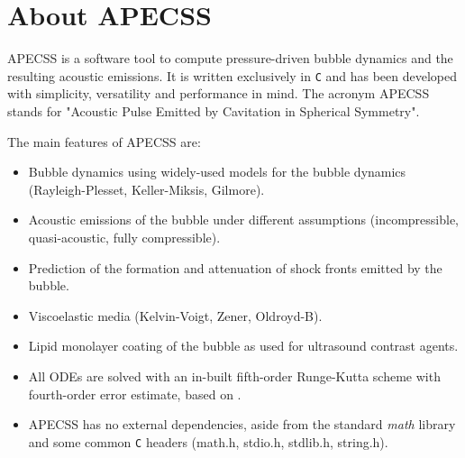 \chapter{About APECSS}

APECSS is a software tool to compute pressure-driven bubble dynamics and the resulting acoustic emissions. It is written exclusively in {\tt C} and has been developed with simplicity, versatility and performance in mind. The acronym APECSS stands for "Acoustic Pulse Emitted by Cavitation in Spherical Symmetry".

The main features of APECSS are:\vspace{-1em}
\begin{itemize}[noitemsep]
\item Bubble dynamics using widely-used models for the bubble dynamics (Rayleigh-Plesset, Keller-Miksis, Gilmore).
\item Acoustic emissions of the bubble under different assumptions (incompressible, quasi-acoustic, fully compressible).
\item Prediction of the formation and attenuation of shock fronts emitted by the bubble.
\item Viscoelastic media (Kelvin-Voigt, Zener, Oldroyd-B).
\item Lipid monolayer coating of the bubble as used for ultrasound contrast agents.
\item All ODEs are solved with an in-built fifth-order Runge-Kutta scheme with fourth-order error estimate, based on \citet{Dormand1980}.
\item APECSS has no external dependencies, aside from the standard {\it math} library and some common {\tt C} headers (math.h, stdio.h, stdlib.h, string.h).
\end{itemize}

